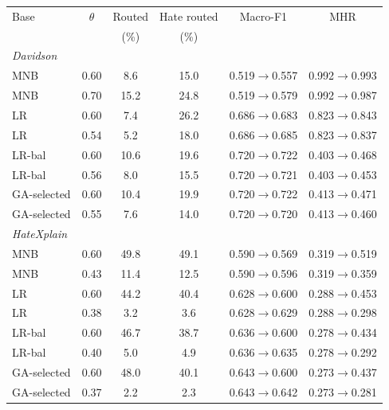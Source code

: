 \begin{tabular}{lccccc}
\toprule
Base & $\theta$ & Routed & Hate routed & Macro-F1 & MHR \\
 & & (\%) & (\%) & & \\
\midrule
\multicolumn{6}{l}{\textit{Davidson}} \\
MNB & 0.60 & 8.6 & 15.0 & 0.519$\to$0.557 & 0.992$\to$0.993 \\
MNB & 0.70 & 15.2 & 24.8 & 0.519$\to$0.579 & 0.992$\to$0.987 \\
LR & 0.60 & 7.4 & 26.2 & 0.686$\to$0.683 & 0.823$\to$0.843 \\
LR & 0.54 & 5.2 & 18.0 & 0.686$\to$0.685 & 0.823$\to$0.837 \\
LR-bal & 0.60 & 10.6 & 19.6 & 0.720$\to$0.722 & 0.403$\to$0.468 \\
LR-bal & 0.56 & 8.0 & 15.5 & 0.720$\to$0.721 & 0.403$\to$0.453 \\
GA-selected & 0.60 & 10.4 & 19.9 & 0.720$\to$0.722 & 0.413$\to$0.471 \\
GA-selected & 0.55 & 7.6 & 14.0 & 0.720$\to$0.720 & 0.413$\to$0.460 \\
\midrule
\multicolumn{6}{l}{\textit{HateXplain}} \\
MNB & 0.60 & 49.8 & 49.1 & 0.590$\to$0.569 & 0.319$\to$0.519 \\
MNB & 0.43 & 11.4 & 12.5 & 0.590$\to$0.596 & 0.319$\to$0.359 \\
LR & 0.60 & 44.2 & 40.4 & 0.628$\to$0.600 & 0.288$\to$0.453 \\
LR & 0.38 & 3.2 & 3.6 & 0.628$\to$0.629 & 0.288$\to$0.298 \\
LR-bal & 0.60 & 46.7 & 38.7 & 0.636$\to$0.600 & 0.278$\to$0.434 \\
LR-bal & 0.40 & 5.0 & 4.9 & 0.636$\to$0.635 & 0.278$\to$0.292 \\
GA-selected & 0.60 & 48.0 & 40.1 & 0.643$\to$0.600 & 0.273$\to$0.437 \\
GA-selected & 0.37 & 2.2 & 2.3 & 0.643$\to$0.642 & 0.273$\to$0.281 \\
\bottomrule
\end{tabular}
